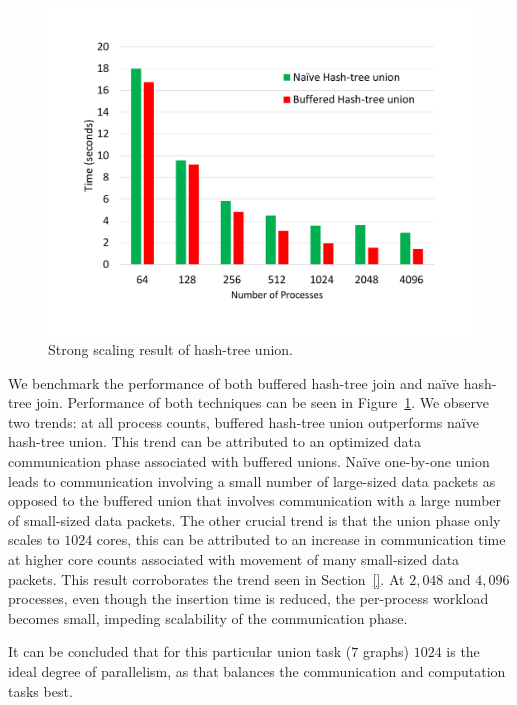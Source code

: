 \begin{figure}[h]
	\includegraphics[width=\columnwidth]{results/hash_tree_union.pdf}
	\caption{Strong scaling result of hash-tree union.}
	\label{fig:dist_union}
\end{figure}

We benchmark the performance of both buffered hash-tree join and na\"ive hash-tree join. 
Performance of both techniques can be seen in Figure~\ref{fig:dist_union}. We observe two trends: at all process counts, buffered hash-tree union outperforms na\"ive hash-tree union. This trend can be attributed to an optimized data communication phase associated with buffered unions. Na\"ive one-by-one union leads to communication involving a small number of large-sized data packets as opposed to the buffered union that involves communication with a large number of small-sized data packets. 
The other crucial trend is that the union phase only scales to $1024$ cores, this can be attributed to an increase in communication time at higher core counts associated with movement of many small-sized data packets. This result corroborates the trend seen in Section~\ref{}. At $2,\!048$ and $4,\!096$ processes, even though the insertion time is reduced, the per-process workload becomes small, impeding scalability of the communication phase. 

It can be concluded that for this particular union task ($7$ graphs) $1024$ is the ideal degree of parallelism, as that balances the communication and computation tasks best.


